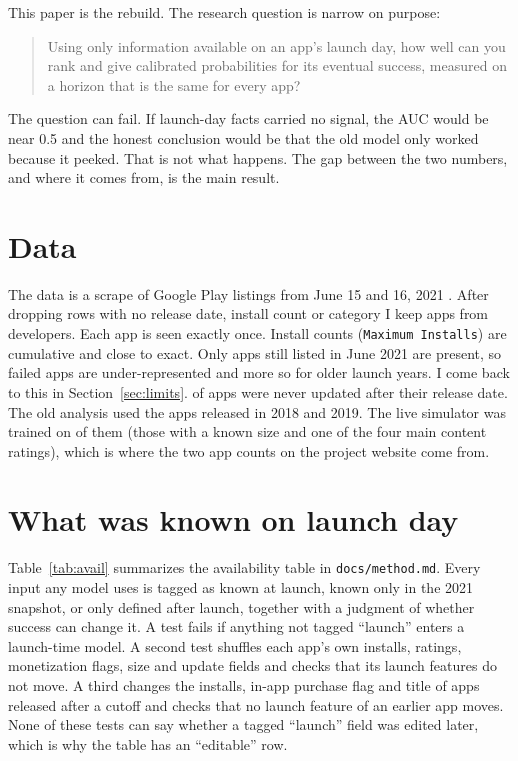\documentclass[11pt]{article}
\begin{document}
This paper is the rebuild. The research question is narrow on purpose:

\begin{quote}
Using only information available on an app's launch day, how well can you rank and give calibrated probabilities for
its eventual success, measured on a horizon that is the same for every app?
\end{quote}

The question can fail. If launch-day facts carried no signal, the AUC would be near 0.5 and the honest conclusion
would be that the old model only worked because it peeked. That is not what happens. The gap between the two
numbers, and where it comes from, is the main result.

\section{Data}

The data is a scrape of \RawRows{} Google Play listings from June 15 and 16, 2021 \citep{prakash2021}. After dropping
rows with no release date, install count or category I keep \CleanApps{} apps from \Developers{} developers. Each app is seen exactly once.
Install counts (\texttt{Maximum Installs}) are cumulative and close to exact. Only apps still listed in June 2021 are
present, so failed apps are under-represented and more so for older launch years. I come back to this in Section~\ref{sec:limits}. \NeverUpdated{} of apps were never updated after their release date. The old analysis used the
\CohortApps{} apps released in 2018 and 2019. The live simulator was trained on \SimApps{} of them (those with a
known size and one of the four main content ratings), which is where the two app counts on the project website come
from.

\section{What was known on launch day}

Table~\ref{tab:avail} summarizes the availability table in \texttt{docs/method.md}. Every input any model uses is
tagged as known at launch, known only in the 2021 snapshot, or only defined after launch, together with a judgment of
whether success can change it. A test fails if anything not tagged ``launch'' enters a launch-time model. A second test shuffles each app's own
installs, ratings, monetization flags, size and update fields and checks that its launch features do not move. A third
changes the installs, in-app purchase flag and title of apps released after a cutoff and checks that no launch feature
of an earlier app moves. None of these tests can say whether a tagged ``launch'' field was edited later, which is why the
table has an ``editable'' row.
\end{document}
